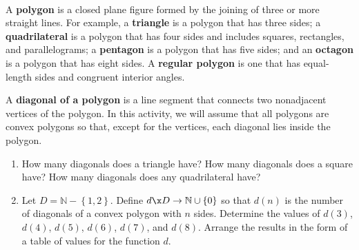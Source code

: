 \begin{previewactivity} \label{PA:diagonals} \hfill \\
A \textbf{polygon}
%
 is a closed plane figure formed by the joining of three or more straight lines. For example, a \textbf{triangle}
%
 is a polygon that has three sides; a \textbf{quadrilateral}
%
 is a polygon that  has four sides and includes squares, rectangles, and parallelograms; a \textbf{pentagon}
%
 is a polygon that  has five sides; and an \textbf{octagon}
%
 is a polygon that has eight sides. A \textbf{regular polygon}
%
%
 is one that has equal-length sides and congruent interior angles.

A \textbf{diagonal of a polygon}
%
%
 is a line segment that connects two nonadjacent vertices of the polygon.  In this activity, we will assume that all polygons are convex polygons so that, except for the vertices, each diagonal lies inside the polygon.

\begin{enumerate}
\item How many diagonals does a triangle have?  How many diagonals does a square have?  How many diagonals does any quadrilateral have?

\item Let   $D = \mathbb{N} - \left\{ {1, 2} \right\}$.  Define   
$d\x D \to \mathbb{N} \cup \left\{ 0 \right\}$ so that   $d( n )$ is the number of diagonals of a  convex polygon with  $n$  sides.   Determine the values of $d(3)$, $d(4)$, $d(5)$, $d(6)$, $d(7)$, and $d(8)$.  Arrange the results in the form of a table of values for the function $d$.
\label{PA:diagonals2}
%


\end{enumerate}
\end{previewactivity}
